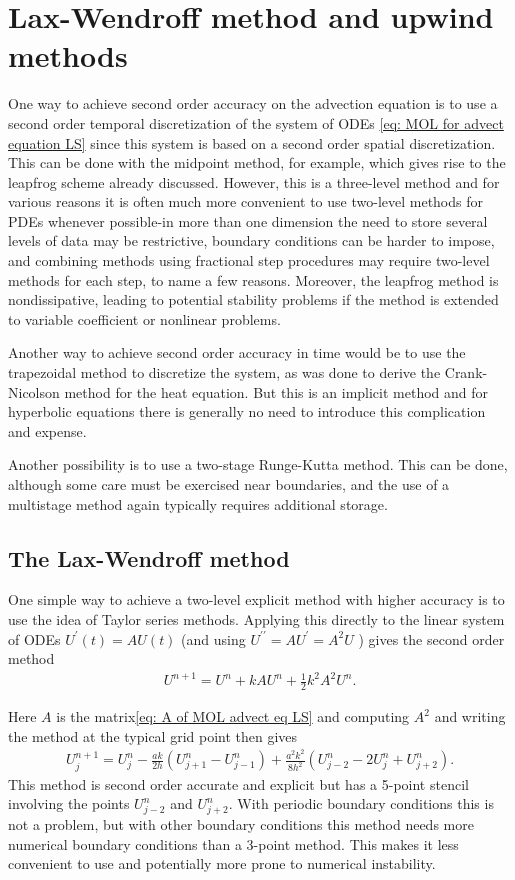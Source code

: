 \chapter{Lax-Wendroff method and upwind methods}
One way to achieve second order accuracy on the advection equation is to use a second order temporal discretization of the system of ODEs \eqref{eq: MOL for advect equation LS} since this system is based on a second order spatial discretization. This can be done with the midpoint method, for example, which gives rise to the leapfrog scheme already discussed. However, this is a three-level method and for various reasons it is often much more convenient to use two-level methods for PDEs whenever possible-in more than one dimension the need to store several levels of data may be restrictive, boundary conditions can be harder to impose, and combining methods using fractional step procedures may require two-level methods for each step, to name a few reasons. Moreover, the leapfrog method is nondissipative, leading to potential stability problems if the method is extended to variable coefficient or nonlinear problems.

Another way to achieve second order accuracy in time would be to use the trapezoidal method to discretize the system, as was done to derive the Crank-Nicolson method for the heat equation. But this is an implicit method and for hyperbolic equations there is generally no need to introduce this complication and expense.

Another possibility is to use a two-stage Runge-Kutta method. This can be done, although some care must be exercised near boundaries, and the use of a multistage method again typically requires additional storage.

\section{The Lax-Wendroff method}
 
One simple way to achieve a two-level explicit method with higher accuracy is to use the idea of Taylor series methods. Applying this directly to the linear system of ODEs $U^{\prime}(t)=A U(t)$ (and using $U^{\prime \prime}=A U^{\prime}=A^2 U$ ) gives the second order method
\begin{align*}
U^{n+1}=U^n+k A U^n+\frac{1}{2} k^2 A^2 U^n .
\end{align*}

Here $A$ is the matrix\eqref{eq: A of MOL advect eq LS} and computing $A^2$ and writing the method at the typical grid point then gives
\begin{align*}
U_j^{n+1}=U_j^n-\frac{a k}{2 h}\left(U_{j+1}^n-U_{j-1}^n\right)+\frac{a^2 k^2}{8 h^2}\left(U_{j-2}^n-2 U_j^n+U_{j+2}^n\right) .
\end{align*}
This method is second order accurate and explicit but has a 5-point stencil involving the points $U_{j-2}^n$ and $U_{j+2}^n$. With periodic boundary conditions this is not a problem, but with other boundary conditions this method needs more numerical boundary conditions than a 3-point method. This makes it less convenient to use and potentially more prone to numerical instability.

